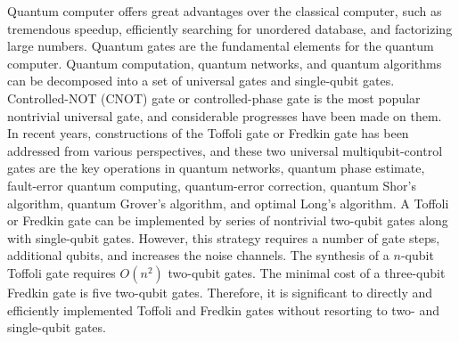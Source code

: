 \documentclass[showpacs,preprintnumbers,showkeys,amsmath,amssymb]{revtex4}%
\begin{document}
Quantum computer offers great advantages over the classical computer\cite{Book}, such as tremendous speedup, efficiently searching for unordered database, and factorizing large numbers. Quantum gates are the fundamental elements for the quantum computer. Quantum computation, quantum networks, and quantum algorithms can be decomposed into a set of universal gates and single-qubit gates\cite{network}. Controlled-NOT (CNOT) gate or controlled-phase gate is the most popular nontrivial universal gate\cite{Universal}, and considerable progresses have been made on them\cite{progress1,progress2,long1}. In recent years, constructions of the Toffoli gate\cite{Toffoli} or Fredkin gate\cite{Fredkin} has been addressed from various perspectives, and these two universal multiqubit-control gates are the key operations in quantum networks, quantum phase estimate, fault-error quantum computing, quantum-error correction, quantum Shor's algorithm\cite{Shor1,Shor2}, quantum Grover's algorithm\cite{Grover1}, and optimal Long's algorithm\cite{Grover2}. A Toffoli or Fredkin gate can be implemented by series of nontrivial two-qubit gates along with single-qubit gates. However, this strategy requires a number of gate steps, additional qubits, and increases the noise channels.  The synthesis of a $n$-qubit Toffoli gate requires $O(n^2)$ two-qubit gates\cite{Universal}. The minimal cost of a three-qubit Fredkin gate is five two-qubit gates\cite{Fredkin-cost}.  Therefore, it is significant to directly and efficiently implemented  Toffoli and Fredkin gates without resorting to two- and single-qubit gates.
\end{document}
